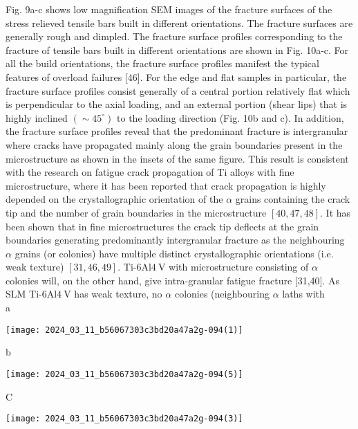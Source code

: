 \documentclass[10pt]{article}
\begin{document}
Fig. 9a-c shows low magnification SEM images of the fracture surfaces of the stress relieved tensile bars built in different orientations. The fracture surfaces are generally rough and dimpled. The fracture surface profiles corresponding to the fracture of tensile bars built in different orientations are shown in Fig. 10a-c. For all the build orientations, the fracture surface profiles manifest the typical features of overload failures [46]. For the edge and flat samples in particular, the fracture surface profiles consist generally of a central portion relatively flat which is perpendicular to the axial loading, and an external portion (shear lips) that is highly inclined $\left(\sim 45^{\circ}\right)$ to the loading direction (Fig. 10b and c). In addition, the fracture surface profiles reveal that the predominant fracture is intergranular where cracks have propagated mainly along the grain boundaries present in the microstructure as shown in the insets of the same figure. This result is consistent with the research on fatigue crack propagation of Ti alloys with fine microstructure, where it has been reported that crack propagation is highly depended on the crystallographic orientation of the $\alpha$ grains containing the crack tip and the number of grain boundaries in the microstructure $[40,47,48]$. It has been shown that in fine microstructures the crack tip deflects at the grain boundaries generating predominantly intergranular fracture as the neighbouring $\alpha$ grains (or colonies) have multiple distinct crystallographic orientations (i.e. weak texture) $[31,46,49]$. Ti-6Al$4 \mathrm{~V}$ with microstructure consisting of $\alpha$ colonies will, on the other hand, give intra-granular fatigue fracture [31,40]. As SLM Ti-6Al$4 \mathrm{~V}$ has weak texture, no $\alpha$ colonies (neighbouring $\alpha$ laths with\\
a

\begin{center}
\texttt{[image: 2024\_03\_11\_b56067303c3bd20a47a2g-094(1)]}
\end{center}

b

\begin{center}
\texttt{[image: 2024\_03\_11\_b56067303c3bd20a47a2g-094(5)]}
\end{center}

C

\begin{center}
\texttt{[image: 2024\_03\_11\_b56067303c3bd20a47a2g-094(3)]}
\end{center}
\end{document}
